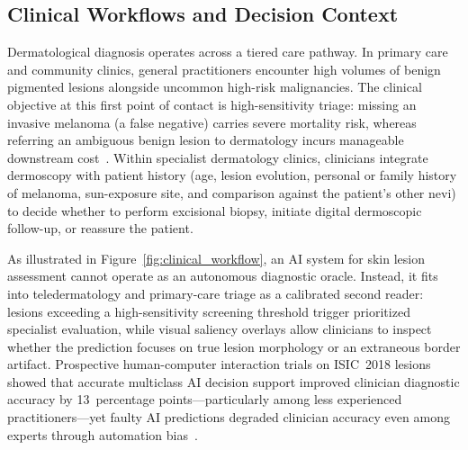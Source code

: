 \subsection{Clinical Workflows and Decision Context}
Dermatological diagnosis operates across a tiered care pathway. In primary care and community clinics, general practitioners encounter high volumes of benign pigmented lesions alongside uncommon high-risk malignancies. The clinical objective at this first point of contact is high-sensitivity triage: missing an invasive melanoma (a false negative) carries severe mortality risk, whereas referring an ambiguous benign lesion to dermatology incurs manageable downstream cost~\cite{Tschandl2019comparison}. Within specialist dermatology clinics, clinicians integrate dermoscopy with patient history (age, lesion evolution, personal or family history of melanoma, sun-exposure site, and comparison against the patient's other nevi) to decide whether to perform excisional biopsy, initiate digital dermoscopic follow-up, or reassure the patient.



As illustrated in Figure~\ref{fig:clinical_workflow}, an AI system for skin lesion assessment cannot operate as an autonomous diagnostic oracle. Instead, it fits into teledermatology and primary-care triage as a calibrated second reader: lesions exceeding a high-sensitivity screening threshold trigger prioritized specialist evaluation, while visual saliency overlays allow clinicians to inspect whether the prediction focuses on true lesion morphology or an extraneous border artifact. Prospective human-computer interaction trials on ISIC~2018 lesions showed that accurate multiclass AI decision support improved clinician diagnostic accuracy by 13~percentage points—particularly among less experienced practitioners—yet faulty AI predictions degraded clinician accuracy even among experts through automation bias~\cite{Tschandl2020human}.

